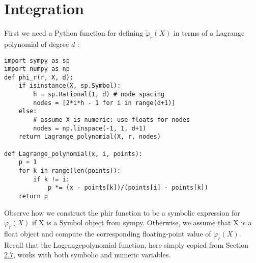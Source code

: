 \documentclass[../main.tex]{subfiles}
\begin{document}
\section[Integration]{Integration}
\label{sec:sec_4_1}
First we need a Python function for defining $\tilde{\varphi}_{r}(X)$ in terms of a Lagrange polynomial of degree $d$ :
\begin{lstlisting}[numbers=none]
import sympy as sp
import numpy as np
def phi_r(r, X, d):
	if isinstance(X, sp.Symbol):
		h = sp.Rational(1, d) # node spacing
		nodes = [2*i*h - 1 for i in range(d+1)]
	else:
		# assume X is numeric: use floats for nodes
		nodes = np.linspace(-1, 1, d+1)
	return Lagrange_polynomial(X, r, nodes)
	
def Lagrange_polynomial(x, i, points):
	p = 1
	for k in range(len(points)):
		if k != i:
			p *= (x - points[k])/(points[i] - points[k])
	return p	
\end{lstlisting}
Observe how we construct the phi\textunderscore r function to be a symbolic expression for $\tilde{\varphi}_{r}(X)$ if $\mathrm{X}$ is a Symbol object from sympy. Otherwise, we assume that $\mathrm{X}$ is a float object and compute the corresponding floating-point value of $\ddot{\varphi}_{r}(X)$. Recall that the Lagrange\textunderscore polynomial function, here simply copied from Section \hyperref[sec:sec_2_7]{2.7}, works with both symbolic and numeric variables.
\end{document}
